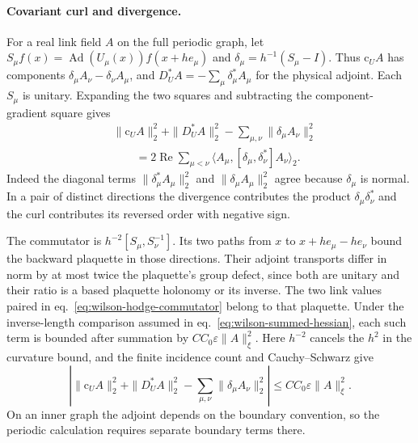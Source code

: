 \documentclass[11pt,letterpaper,reqno]{amsart}
\numberwithin{equation}{section}
\renewcommand{\eqref}[1]{\textup{eq.~\ref{#1}}}
\theoremstyle{definition}
\theoremstyle{remark}
\begin{document}
\paragraph{Covariant curl and divergence.}
For a real link field $A$ on the full periodic graph, let
\(S_\mu f(x)=\operatorname{Ad}(U_\mu(x))f(x+he_\mu)\)
and \(\delta_\mu=h^{-1}(S_\mu-I)\). Thus
\(\mathrm c_U A\) has components
\(\delta_\mu A_\nu-\delta_\nu A_\mu\),
and \(D_U^\ast A=-\sum_\mu\delta_\mu^\ast A_\mu\) for the
physical adjoint. Each \(S_\mu\) is unitary. Expanding the two
squares and subtracting the component-gradient square gives
\begin{equation}\label{eq:wilson-hodge-commutator}
 \begin{split}
 &\|\mathrm c_U A\|_2^2+\|D_U^\ast A\|_2^2
                        -\sum_{\mu,\nu}\|\delta_\mu A_\nu\|_2^2\\
 &\qquad=2\operatorname{Re}\sum_{\mu<\nu}
       \langle A_\mu,[\delta_\mu,\delta_\nu^\ast]A_\nu\rangle_2 .
 \end{split}
\end{equation}
Indeed the diagonal terms
\(\|\delta_\mu^\ast A_\mu\|_2^2\) and
\(\|\delta_\mu A_\mu\|_2^2\) agree because
\(\delta_\mu\) is normal. In a pair of distinct directions the
divergence contributes the product \(\delta_\mu\delta_\nu^\ast\)
and the curl contributes its reversed order with negative sign.

The commutator is \(h^{-2}[S_\mu,S_\nu^{-1}]\).
Its two paths from \(x\) to \(x+he_\mu-he_\nu\) bound the
backward plaquette in those directions. Their adjoint transports
differ in norm by at most twice the plaquette's group defect,
since both are unitary and their ratio is a based plaquette
holonomy or its inverse. The two link values paired in
\eqref{eq:wilson-hodge-commutator} belong to that plaquette.
Under the inverse-length comparison assumed in
\eqref{eq:wilson-summed-hessian}, each such term is bounded
after summation by \(C C_0\varepsilon\|A\|_\xi^2\).
Here \(h^{-2}\) cancels the \(h^2\) in the curvature bound,
and the finite incidence count and Cauchy--Schwarz give
\begin{equation}\label{eq:wilson-hodge-bound}
 \left|\|\mathrm c_U A\|_2^2+\|D_U^\ast A\|_2^2
            -\sum_{\mu,\nu}\|\delta_\mu A_\nu\|_2^2\right|
       \leq C C_0\varepsilon\|A\|_\xi^2 .
\end{equation}
On an inner graph the adjoint depends on the boundary convention,
so the periodic calculation requires separate boundary terms there.
\end{document}
